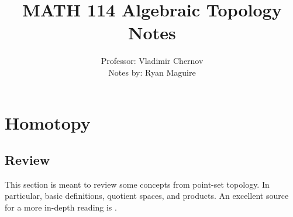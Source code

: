 \documentclass{book}                                                           %
\begin{document}
    \title{MATH 114 Algebraic Topology Notes}
    \author{%
        Professor: Vladimir Chernov\\
        Notes by: Ryan Maguire%
    }
    \date{\vspace{-5ex}}
    \maketitle
    \tableofcontents
    \listoffigures
    \chapter{Homotopy}
        \section{Review}
            This section is meant to review some concepts from point-set
            topology. In particular, basic definitions, quotient spaces, and
            products. An excellent source for a more in-depth reading is
            \cite{Munkres2000}.
\end{document}
